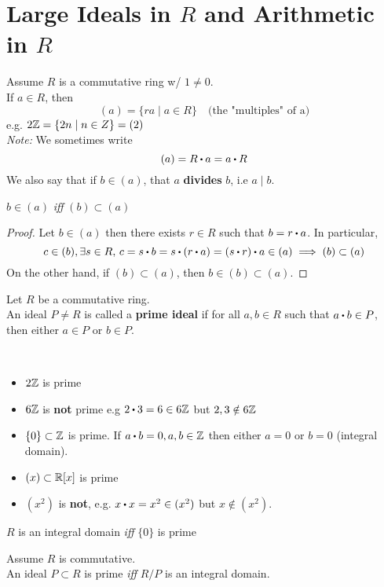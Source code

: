 \documentclass[../Main.tex]{subfiles}
\begin{document}
\section*{Large Ideals in \texorpdfstring{$R$}{TEXT} and Arithmetic in \texorpdfstring{$R$}{TEXT}}
Assume $R$ is a commutative ring w/ $1\ne 0$. \\
If $a\in R$, then
\[(a)=\{ra\mid a\in R\} \quad \text{(the "multiples" of a)}\]
e.g. $2\mathbb{Z}=\{2n\mid n\in Z\}=(2)$\\
\textit{Note:} We sometimes write
\[(a)=R\rdot a=a\rdot R\]
We also say that if $b\in (a)$, that $a$ \textbf{divides} $b$, i.e $a\mid b$.
\begin{claim}
	$b\in (a)$ \textit{iff} $(b) \subset (a)$
\end{claim}
\begin{proof}
	Let $b\in (a)$ then there exists $r\in R$ such that $b=r\rdot a$. In particular,
	\[c\in (b), \exists s\in R, \, c=s\rdot b=s\rdot (r\rdot a)=(s\rdot r)\rdot a\in (a)\implies (b) \subset (a)\]
	On the other hand, if $(b)\subset (a)$, then $b\in (b) \subset (a)$.
\end{proof}
\begin{dfn}[title = Prime Ideal]
	Let $R$ be a commutative ring.\\
	An ideal $P\ne R$ is called a \textbf{prime ideal} if for all $a,b\in R$ such that $a\rdot b\in P$, then either $a\in P$ or $b\in P$.
\end{dfn}
\newpage
\begin{example}~
\begin{itemize}
	\item$2\mathbb{Z}$ is prime
	\item$6\mathbb{Z}$ is \textbf{not} prime e.g $2\rdot 3 = 6 \in 6\Z$ but $2,3\notin 6\mathbb{Z}$
	\item $\{0\} \subset \mathbb{Z}$ is prime. If $a\rdot b=0, a,b \in \Z$ then either $a=0$ or $b=0$ (integral domain).
	\item $(x)\subset \mathbb{R}[x]$ is prime
	\item $(x^2)$ is \textbf{not}, e.g. $x\rdot x=x^2\in (x^2)$ but $x\notin (x^2)$.
\end{itemize}
\end{example}
\begin{prop}[title = \texorpdfstring{$R$}{PDFstring} integral if \texorpdfstring{$\{0\}$}{TEXT} prime]
	$R$ is an integral domain \textit{iff} $\{0\}$ is prime
\end{prop}
\begin{thm}[title = Prime Ideal \texorpdfstring{$\Longleftrightarrow R/P$}{TEXT} integral domain]
	Assume $R$ is commutative.\\
	An ideal $P\subset R$ is prime \textit{iff} $R/P$ is an integral domain.
\end{thm}
\end{document}
